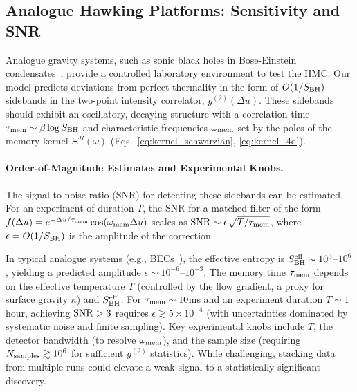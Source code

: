 \documentclass[a4paper,11pt]{article}
\newcommand{\eg}{e.g.\xspace}
\newcommand{\HMC}{\textup{\textsc{HMC}}\xspace}
\theoremstyle{plain}
\theoremstyle{definition}
\theoremstyle{remark}
\begin{document}
\subsection{Analogue Hawking Platforms: Sensitivity and SNR}
\label{sec:analogue_platforms}
Analogue gravity systems, such as sonic black holes in Bose-Einstein condensates~\cite{Barcelo:2011, Steinhauer:2016}, provide a controlled laboratory environment to test the \HMC{}. Our model predicts deviations from perfect thermality in the form of $O(1/S_{\rm BH})$ sidebands in the two-point intensity correlator, $g^{(2)}(\Delta u)$. These sidebands should exhibit an oscillatory, decaying structure with a correlation time $\tau_{\rm mem}\sim \beta \log S_{\rm BH}$ and characteristic frequencies $\omega_{\rm mem}$ set by the poles of the memory kernel $\Xi^R(\omega)$ (Eqs.~\ref{eq:kernel_schwarzian}, \ref{eq:kernel_4d}).

\paragraph{Order-of-Magnitude Estimates and Experimental Knobs.}
The signal-to-noise ratio (SNR) for detecting these sidebands can be estimated. For an experiment of duration $T$, the SNR for a matched filter of the form $f(\Delta u) = e^{-\Delta u/\tau_{\rm mem}}\cos(\omega_{\rm mem}\Delta u)$ scales as ${\rm SNR}\sim \epsilon\sqrt{T/\tau_{\rm mem}}$, where $\epsilon=O(1/S_{\rm BH})$ is the amplitude of the correction.

In typical analogue systems (\eg, BECs~\cite{Steinhauer:2016}), the effective entropy is $S_{\rm BH}^{\rm eff} \sim 10^3$--$10^6$, yielding a predicted amplitude $\epsilon \sim 10^{-6}$--$10^{-3}$. The memory time $\tau_{\rm mem}$ depends on the effective temperature $T$ (controlled by the flow gradient, a proxy for surface gravity $\kappa$) and $S_{\rm BH}^{\rm eff}$. For $\tau_{\rm mem} \sim 10$ms and an experiment duration $T \sim 1$ hour, achieving ${\rm SNR} > 3$ requires $\epsilon \gtrsim 5\times 10^{-4}$ (with uncertainties dominated by systematic noise and finite sampling). Key experimental knobs include $T$, the detector bandwidth (to resolve $\omega_{\rm mem}$), and the sample size (requiring $N_{\rm samples} \gtrsim 10^6$ for sufficient $g^{(2)}$ statistics). While challenging, stacking data from multiple runs could elevate a weak signal to a statistically significant discovery.
\end{document}
